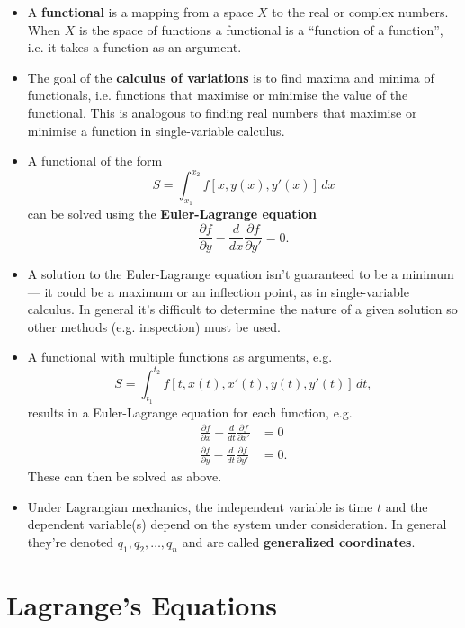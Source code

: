 \documentclass{article}
\begin{document}
\begin{itemize}
  \item A \textbf{functional} is a mapping from a space $X$ to the real or complex numbers. When $X$ is the space of functions a functional is a ``function of a function'', i.e. it takes a function as an argument.

  \item The goal of the \textbf{calculus of variations} is to find maxima and minima of functionals, i.e. functions that maximise or minimise the value of the functional. This is analogous to finding real numbers that maximise or minimise a function in single-variable calculus.

  \item A functional of the form \[S = \int_{x_1}^{x_2} f[x, y(x), y'(x)] \,dx\] can be solved using the \textbf{Euler-Lagrange equation} \[\frac{\partial f}{\partial y} - \frac{d}{d x} \frac{\partial f}{\partial y'} = 0.\]

  \item A solution to the Euler-Lagrange equation isn't guaranteed to be a minimum — it could be a maximum or an inflection point, as in single-variable calculus. In general it's difficult to determine the nature of a given solution so other methods (e.g. inspection) must be used.

  \item A functional with multiple functions as arguments, e.g. \[S = \int_{t_1}^{t_2} f[t, x(t), x'(t), y(t), y'(t)] \,dt,\] results in a Euler-Lagrange equation for each function, e.g. \begin{align*}
          \frac{\partial f}{\partial x} - \frac{d}{d t} \frac{\partial f}{\partial x'} & = 0  \\
          \frac{\partial f}{\partial y} - \frac{d}{d t} \frac{\partial f}{\partial y'} & = 0.
        \end{align*} These can then be solved as above.

  \item Under Lagrangian mechanics, the independent variable is time $t$ and the dependent variable(s) depend on the system under consideration. In general they're denoted $q_1, q_2, \ldots, q_n$ and are called \textbf{generalized coordinates}.
\end{itemize}

\section{Lagrange's Equations}
\end{document}
